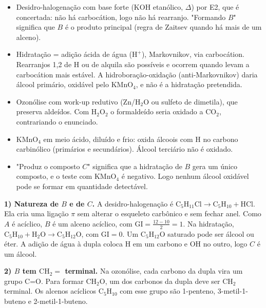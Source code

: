 \documentclass{article}%
\begin{document}
\begin{itemize}
\item[(H1)] Desidro-halogenação com base forte (KOH etanólico, $\Delta$) por E2, que é concertada: não há carbocátion, logo não há rearranjo. "Formando $B$" significa que $B$ é o produto principal (regra de Zaitsev quando há mais de um alceno).
\item[(H2)] Hidratação = adição ácida de água ($\mathrm{H^+}$), Markovnikov, via carbocátion. Rearranjos 1,2 de H ou de alquila são possíveis e ocorrem quando levam a carbocátion mais estável. A hidroboração-oxidação (anti-Markovnikov) daria álcool primário, oxidável pelo $\mathrm{KMnO_4}$, e não é a hidratação pretendida.
\item[(H3)] Ozonólise com work-up redutivo (Zn/$\mathrm{H_2O}$ ou sulfeto de dimetila), que preserva aldeídos. Com $\mathrm{H_2O_2}$ o formaldeído seria oxidado a $\mathrm{CO_2}$, contrariando o enunciado.
\item[(H4)] $\mathrm{KMnO_4}$ em meio ácido, diluído e frio: oxida álcoois com H no carbono carbinólico (primários e secundários). Álcool terciário não é oxidado.
\item[(H5)] "Produz o composto $C$" significa que a hidratação de $B$ gera um único composto, e o teste com $\mathrm{KMnO_4}$ é negativo. Logo nenhum álcool oxidável pode se formar em quantidade detectável.
\end{itemize}

\textbf{1) Natureza de $B$ e de $C$.}
A desidro-halogenação é $\mathrm{C_5H_{11}Cl}\rightarrow \mathrm{C_5H_{10}}+\mathrm{HCl}$. Ela cria uma ligação $\pi$ sem alterar o esqueleto carbônico e sem fechar anel. Como $A$ é acíclico, $B$ é um alceno acíclico, com $\mathrm{GI}=\frac{12-10}{2}=1$. Na hidratação, $\mathrm{C_5H_{10}}+\mathrm{H_2O}\rightarrow \mathrm{C_5H_{12}O}$, com $\mathrm{GI}=0$. Um $\mathrm{C_5H_{12}O}$ saturado pode ser álcool ou éter. A adição de água à dupla coloca H em um carbono e OH no outro, logo $C$ é um álcool.

\textbf{2) $B$ tem $\mathrm{CH_2=}$ terminal.}
Na ozonólise, cada carbono da dupla vira um grupo C=O. Para formar $\mathrm{CH_2O}$, um dos carbonos da dupla deve ser $\mathrm{CH_2}$ terminal. Os alcenos acíclicos $\mathrm{C_5H_{10}}$ com esse grupo são 1-penteno, 3-metil-1-buteno e 2-metil-1-buteno.
\end{document}

